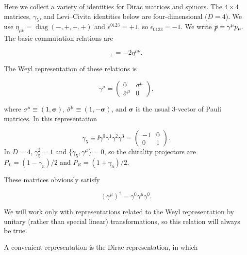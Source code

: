 
Here we collect a variety of identities for Dirac matrices and spinors. The
$4\times4$ matrices, $\gamma_5$, and Levi--Civita identities below are
four-dimensional ($D=4$). We use
$\eta_{\mu\nu}=\operatorname{diag}(-,+,+,+)$ and
$\epsilon^{0123}=+1$, so $\epsilon_{0123}=-1$. We write
$\slashed p=\gamma^\mu p_\mu$. The basic commutation relations are

\begin{equation}
[\gamma^\mu,\gamma^\nu]_+=-2\eta^{\mu\nu}.
\label{eq:C.1}
\end{equation}

The Weyl representation of these relations is

\begin{equation}
\gamma^\mu=\begin{pmatrix}0&\sigma^\mu\\[2pt]\bar\sigma^\mu&0\end{pmatrix}.
\label{eq:C.2}
\end{equation}

where $\sigma^\mu\equiv(1,\boldsymbol{\sigma})$,
$\bar\sigma^\mu\equiv(1,-\boldsymbol{\sigma})$, and $\boldsymbol{\sigma}$ is
the usual 3-vector of Pauli matrices. In this representation

\[
\gamma_5\equiv\ii\gamma^0\gamma^1\gamma^2\gamma^3
=\begin{pmatrix}-1&0\\0&1\end{pmatrix}.
\]
In $D=4$, $\gamma_5^2=1$ and
$\{\gamma_5,\gamma^\mu\}=0$, so the chirality projectors are
$P_L=(1-\gamma_5)/2$ and $P_R=(1+\gamma_5)/2$.

These matrices obviously satisfy

\begin{equation}
(\gamma^\mu)^\dagger=\gamma^0\gamma^\mu\gamma^0.
\label{eq:C.3}
\end{equation}

We will work only with representations related to the Weyl representation by unitary
(rather than special linear) transformations, so this relation will always be true.

A convenient representation is the Dirac representation, in which

